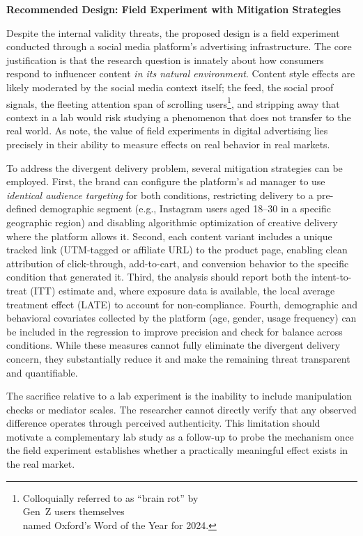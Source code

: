 \documentclass[10pt]{article}
\begin{document}
\textbf{Recommended Design: Field Experiment with Mitigation Strategies}

Despite the internal validity threats, the proposed design is a field experiment conducted through a social media platform's advertising infrastructure. The core justification is that the research question is innately about how consumers respond to influencer content \textit{in its natural environment}. Content style effects are likely moderated by the social media context itself; the feed, the social proof signals, the fleeting attention span of scrolling users\footnote{Colloquially referred to as ``brain rot'' by\\Gen~Z users themselves\\named Oxford's Word of the Year for 2024.}, and stripping away that context in a lab would risk studying a phenomenon that does not transfer to the real world. As \textcite{gordon2019comparison} note, the value of field experiments in digital advertising lies precisely in their ability to measure effects on real behavior in real markets.

To address the divergent delivery problem, several mitigation strategies can be employed. First, the brand can configure the platform's ad manager to use \textit{identical audience targeting} for both conditions, restricting delivery to a pre-defined demographic segment (e.g., Instagram users aged 18--30 in a specific geographic region) and disabling algorithmic optimization of creative delivery where the platform allows it. Second, each content variant includes a unique tracked link (UTM-tagged or affiliate URL) to the product page, enabling clean attribution of click-through, add-to-cart, and conversion behavior to the specific condition that generated it. Third, the analysis should report both the intent-to-treat (ITT) estimate and, where exposure data is available, the local average treatment effect (LATE) to account for non-compliance. Fourth, demographic and behavioral covariates collected by the platform (age, gender, usage frequency) can be included in the regression to improve precision and check for balance across conditions. While these measures cannot fully eliminate the divergent delivery concern, they substantially reduce it and make the remaining threat transparent and quantifiable.

The sacrifice relative to a lab experiment is the inability to include manipulation checks or mediator scales. The researcher cannot directly verify that any observed difference operates through perceived authenticity. This limitation should motivate a complementary lab study as a follow-up to probe the mechanism once the field experiment establishes whether a practically meaningful effect exists in the real market.
\end{document}
